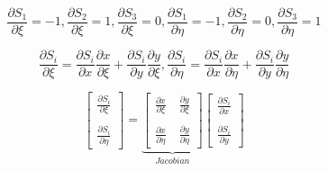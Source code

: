 \documentclass[t,english]{beamer}
\begin{document}
\begin{frame}
$$\frac{\partial S_1}{\partial \xi} = -1  ,    \frac{\partial S_2}{\partial \xi} = 1 ,   \frac{\partial S_3}{\partial \xi} = 0,   \frac{\partial S_1}{\partial \eta} = -1,    \frac{\partial S_2}{\partial \eta} = 0,     \frac{\partial S_3}{\partial \eta} = 1$$

$$\frac{\partial S_i}{\partial \xi} = \frac{\partial S_i}{\partial x}\frac{\partial x}{\partial \xi} + \frac{\partial S_i}{\partial y}\frac{\partial y}{\partial \xi}, \frac{\partial S_i}{\partial \eta} = \frac{\partial S_i}{\partial x}\frac{\partial x}{\partial \eta} + \frac{\partial S_i}{\partial y}\frac{\partial y}{\partial \eta}$$

$$\begin{bmatrix}
\frac{\partial S_i}{\partial \xi} \\ \\ \frac{\partial S_i}{\partial \eta}
\end{bmatrix} = \underbrace{\begin{bmatrix}
\frac{\partial x}{\partial \xi} \quad \frac{\partial y}{\partial \xi}\\ \\ \frac{\partial x}{\partial \eta} \quad \frac{\partial y}{\partial \eta} 
\end{bmatrix}}_{Jacobian} \begin{bmatrix}
\frac{\partial S_i}{\partial x} \\ \\ \frac{\partial S_i}{\partial y}
\end{bmatrix}$$
\end{frame}
\end{document}

